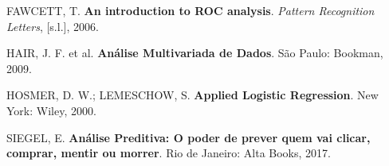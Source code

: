 \documentclass[12pt,brazil,]{book}
\begin{document}
\hypertarget{refs}{}
\leavevmode\hypertarget{ref-Fawcett2006}{}%
FAWCETT, T. \textbf{An introduction to ROC analysis}. \emph{Pattern
Recognition Letters}, {[}s.l.{]}, 2006.

\leavevmode\hypertarget{ref-Hair2009}{}%
HAIR, J. F. et al. \textbf{Análise Multivariada de Dados}. São Paulo:
Bookman, 2009.

\leavevmode\hypertarget{ref-Hosmer2000}{}%
HOSMER, D. W.; LEMESCHOW, S. \textbf{Applied Logistic Regression}. New
York: Wiley, 2000.

\leavevmode\hypertarget{ref-Siegel2017}{}%
SIEGEL, E. \textbf{Análise Preditiva: O poder de prever quem vai clicar,
comprar, mentir ou morrer}. Rio de Janeiro: Alta Books, 2017.

\leavevmode\hypertarget{ref-Torres-Reyna2014}{}%
\end{document}
